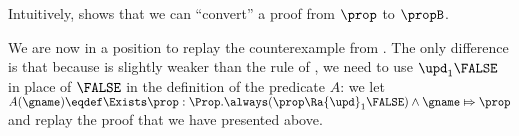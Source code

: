 Intuitively,  shows that we can ``convert'' a proof from $\prop$ to $\propB$.

We are now in a position to replay the counterexample from .
The only difference is that because  is slightly weaker than the rule  of , we need to use ${\upd}_1 \FALSE$ in place of $\FALSE$ in the definition of the predicate $A$:
we let \(
  A(\gname) \eqdef \Exists \prop : \Prop. \always (\prop \Ra {\upd}_1 \FALSE) \land \gname \Mapsto \prop\)
and replay the proof that we have presented above.


